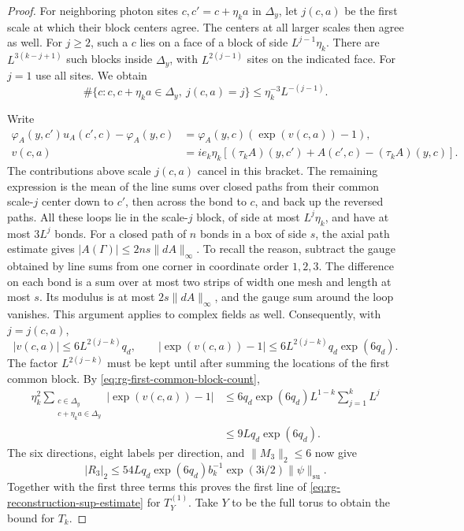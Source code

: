 \begin{proof}
For neighboring photon sites $c,c'=c+\eta_ka$ in $\Delta_y$,
let $j(c,a)$ be the first scale at which their block centers
agree. The centers at all larger scales then agree as well.
For $j\ge2$, such a $c$ lies on a face of a block of side
$L^{j-1}\eta_k$. There are $L^{3(k-j+1)}$ such blocks inside
$\Delta_y$, with $L^{2(j-1)}$ sites on the indicated face.
For $j=1$ use all sites. We obtain
\begin{equation}\label{eq:rg-first-common-block-count}
 \#\{c:c,c+\eta_ka\in\Delta_y,\ j(c,a)=j\}
                         \le\eta_k^{-3}L^{-(j-1)}.
\end{equation}

Write
\[
 \begin{aligned}
 \varphi_A(y,c')u_A(c',c)-\varphi_A(y,c)
    &=\varphi_A(y,c)(\exp(v(c,a))-1),\\
 v(c,a)&=ie_k\eta_k
      [(\tau_kA)(y,c')+A(c',c)-(\tau_kA)(y,c)].
 \end{aligned}
\]
The contributions above scale $j(c,a)$ cancel in this bracket.
The remaining expression is the mean of the line sums over
closed paths from their common scale-$j$ center down to $c'$,
then across the bond to $c$, and back up the reversed paths.
All these loops lie in the scale-$j$ block, of side at most
$L^j\eta_k$, and have at most $3L^j$ bonds.
For a closed path of $n$ bonds in a box of side $s$, the axial
path estimate gives $|A(\Gamma)|\le2ns\|dA\|_\infty$.
To recall the reason, subtract the gauge obtained by line sums
from one corner in coordinate order $1,2,3$. The difference on
each bond is a sum over at most two strips of width one mesh
and length at most $s$. Its modulus is at most
$2s\|dA\|_\infty$, and the gauge sum around the loop vanishes.
This argument applies to complex fields as well.
Consequently, with $j=j(c,a)$,
\begin{equation}\label{eq:rg-reconstruction-phase-defect}
 |v(c,a)|\le6L^{2(j-k)}q_d,\qquad
 |\exp(v(c,a))-1|
                    \le6L^{2(j-k)}q_d\exp(6q_d).
\end{equation}
The factor $L^{2(j-k)}$ must be kept until after summing the
locations of the first common block. By
\eqref{eq:rg-first-common-block-count},
\begin{align*}
 \eta_k^2\sum_{\substack{c\in\Delta_y\\c+\eta_ka\in\Delta_y}}
                                  |\exp(v(c,a))-1|
 &\le6q_d\exp(6q_d)L^{1-k}\sum_{j=1}^kL^j\\
 &\le9Lq_d\exp(6q_d).
\end{align*}
The six directions, eight labels per direction, and
$\|M_3\|_2\le6$ now give
\[
 |R_3|_2\le54Lq_d\exp(6q_d)b_k^{-1}
                         \exp(3\mathfrak i/2)\|\psi\|_{\mathrm{su}}.
\]
Together with the first three terms this proves the first
line of \eqref{eq:rg-reconstruction-sup-estimate} for $T_Y^{(1)}$.
Take $Y$ to be the full torus to obtain the bound for $T_k$.


\end{proof}
